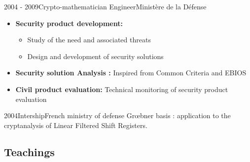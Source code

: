 \documentclass[a4paper]{customcv}
\begin{document}
\begin{cventry}{2004 - 2009}{Crypto-mathematician Engineer}{Ministère de la Défense}
  \begin{itemize}
    \item \textbf{Security product development:}
          \begin{itemize}
            \item Study of the need and associated threats
            \item Design and development of security solutions
          \end{itemize}
    \item \textbf{Security solution Analysis : }
          Inspired from Common Criteria and EBIOS
    \item \textbf{Civil product evaluation:} Technical monitoring of security product evaluation
  \end{itemize}
\end{cventry}

\begin{cventry}{2004}{Intership}{French ministry of defense}
  Gr\oe bner basis : application to the cryptanalysis of Linear Filtered Shift Registers.
  
  
\end{cventry}

\subsection{Teachings}
\end{document}
